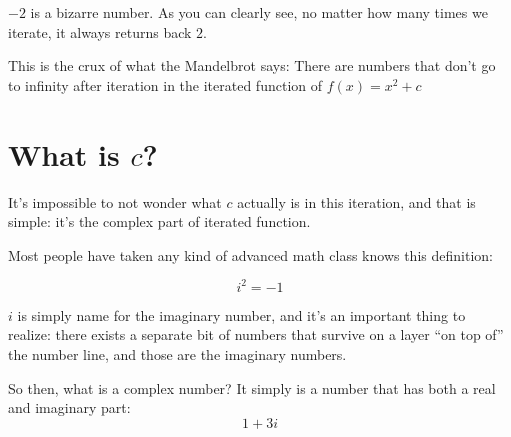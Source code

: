 \documentclass{article}
\begin{document}
$-2$ is a bizarre number.  As you can clearly see, no matter how many times we iterate, it always returns back $2$.

This is the crux of what the Mandelbrot says: There are numbers that don't go to infinity after iteration in the iterated function of $f(x) = x^2 + c$

\section{What is $c$?}
It's impossible to not wonder what $c$ actually is in this iteration, and that is simple: it's the complex part of iterated function.

Most people have taken any kind of advanced math class knows this definition:

$$ i^2 = -1$$

$i$ is simply name for the imaginary number, and it's an important thing to realize: there exists a separate bit of numbers that survive on a layer ``on top of'' the number line, and those are the imaginary numbers.

So then, what is a complex number?  It simply is a number that has both a real and imaginary part:
$$ 1 + 3i$$
\end{document}
